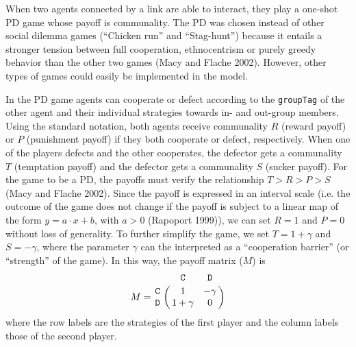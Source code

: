 When two agents connected by a link are able to interact, they play a one-shot PD game whose payoff is communality. The PD was chosen instead of other social dilemma games (``Chicken run'' and ``Stag-hunt'') because it entails a stronger tension between full cooperation, ethnocentrism or purely greedy behavior than the other two games (Macy and Flache 2002). However, other types of games could easily be implemented in the model.

In the PD game agents can cooperate or defect according to the \texttt{groupTag} of the other agent and their individual strategies towards in- and out-group members. Using the standard notation, both agents receive communality $ R $ (reward payoff) or $ P $ (punishment payoff) if they both cooperate or defect, respectively. When one of the players defects and the other cooperates, the defector gets a communality $ T $ (temptation payoff) and the defector gets a communality $ S $ (sucker payoff). For the game to be a PD, the payoffs must verify the relationship $ T > R > P > S $ (Macy and Flache 2002). Since the payoff is expressed in an interval scale (i.e. the outcome of the game does not change if the payoff is subject to a linear map of the form $ y = a \cdot x + b  $, with $ a > 0 $ (Rapoport 1999)), we can set $ R = 1 $ and $ P = 0 $ without loss of generality. To further simplify the game, we set $ T = 1 + \gamma  $ and $ S = - \gamma $, where the parameter $ \gamma $ can the interpreted as a ``cooperation barrier'' (or ``strength'' of the game). In this way, the payoff matrix ($ M $) is
\begin{equation}
\label{eq:7}
M = \bordermatrix{~ & \texttt{C} & \texttt{D} \cr
	\texttt{C} & 1 & - \gamma \cr
	\texttt{D} & 1 + \gamma & 0 \cr}
\end{equation}
where the row labels are the strategies of the first player and the column labels those of the second player.

